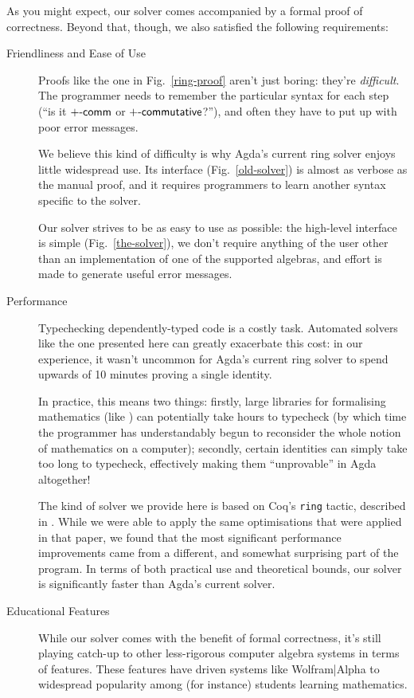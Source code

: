 \documentclass[acmsmall,review,anonymous]{acmart}\settopmatter{printfolios=true,printccs=false,printacmref=false}
\theoremstyle{remark}
\begin{document}
As you might expect, our solver comes accompanied by a formal proof of
correctness. Beyond that, though, we also satisfied the following requirements:
\begin{description}
  \item[Friendliness and Ease of Use] Proofs like the one in
    Fig.~\ref{ring-proof} aren't just boring: they're \emph{difficult}.
    The programmer needs to remember the particular syntax for each step (``is
    it \(\AgdaFunction{+-comm}\) or \(\AgdaFunction{+-commutative}\)?''), and
    often they have to put up with poor error messages.

    We believe this kind of difficulty is why Agda's current ring solver
    \cite{danielsson_agda_2018} enjoys little widespread use. Its interface
    (Fig.~\ref{old-solver}) is almost as verbose as the manual proof, and it
    requires programmers to learn another syntax specific to the solver.

    Our solver strives to be as easy to use as possible: the high-level
    interface is simple (Fig.~\ref{the-solver}), we don't require anything
    of the user other than an implementation of one of the supported algebras,
    and effort is made to generate useful error messages.
  \item[Performance] Typechecking dependently-typed code is a costly task.
    Automated solvers like the one presented here can greatly exacerbate this
    cost: in our experience, it wasn't uncommon for Agda's current ring solver
    to spend upwards of 10 minutes proving a single identity.

    In practice, this means two things: firstly, large libraries for formalising
    mathematics (like \citet{meshveliani_docon-provable_2018}) can potentially
    take hours to typecheck (by which time the programmer has understandably
    begun to reconsider the whole notion of mathematics on a computer);
    secondly, certain identities can simply take too long to typecheck,
    effectively making them ``unprovable'' in Agda altogether!

    The kind of solver we provide here is based on Coq's
    \cite{the_coq_development_team_2018_1219885} \verb+ring+ tactic, described
    in \citet{gregoire_proving_2005}. While we were able to apply the same
    optimisations that were applied in that paper, we found that the most
    significant performance improvements came from a different, and somewhat
    surprising part of the program. In terms of both practical use and
    theoretical bounds, our solver is significantly faster than Agda's current
    solver.
  \item[Educational Features] While our solver comes with the benefit of formal
    correctness, it's still playing catch-up to other less-rigorous computer
    algebra systems in terms of features. These features have driven systems
    like Wolfram|Alpha \cite{wolfram_research_inc._wolframalpha_2019} to
    widespread popularity among (for instance) students learning mathematics.


\end{description}
\end{document}
